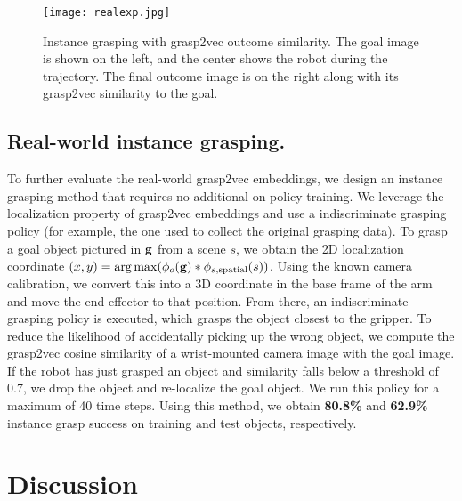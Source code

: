 \documentclass{article}
\begin{document}
\begin{wrapfigure}{r}{0.45\textwidth}
\vspace{-0.05in}
\begin{center}
\texttt{[image: realexp.jpg]}
\end{center}
\caption{Instance grasping with grasp2vec outcome similarity. The goal image is shown on the left, and the center shows the robot during the trajectory. The final outcome image is on the right along with its grasp2vec similarity to the goal.}
\label{fig:realgrasping}
\vspace{-0.2in}
\end{wrapfigure}

\subsection{Real-world instance grasping.}
To further evaluate the real-world grasp2vec embeddings, we design an instance grasping method that requires no additional on-policy training.
We leverage the localization property of grasp2vec embeddings and use a indiscriminate grasping policy (for example, the one used to collect the original grasping data). To grasp a goal object pictured in $\mathbf{g}$ from a scene $s$, we obtain the 2D localization coordinate $(x,y) = \arg\max(\phi_o(\mathbf{g})*\phi_{s,\text{spatial}}(s))$. Using the known camera calibration, we convert this into a 3D coordinate in the base frame of the arm and move the end-effector to that position. From there, an indiscriminate grasping policy is executed, which grasps the object closest to the gripper. To reduce the likelihood of accidentally picking up the wrong object, we compute the grasp2vec cosine similarity of a wrist-mounted camera image with the goal image. If the robot has just grasped an object and similarity falls below a threshold of 0.7, we drop the object and re-localize the goal object. We run this policy for a maximum of 40 time steps. Using this method, we obtain \textbf{80.8\%}  and \textbf{62.9\%} instance grasp success on training and test objects, respectively.

\section{Discussion}
\end{document}
